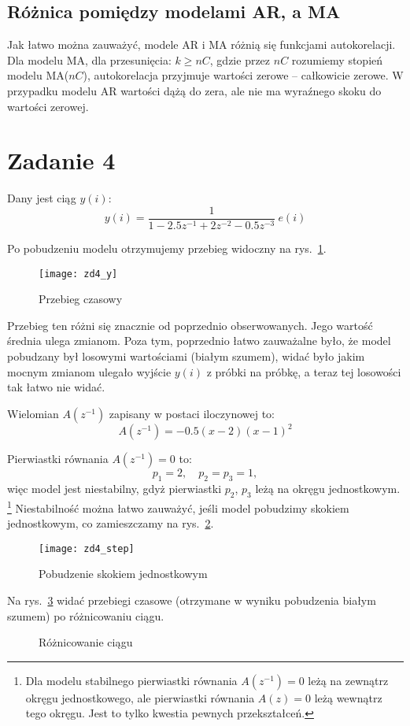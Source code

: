 \documentclass[11pt, a4paper]{article}
\begin{document}
\subsection*{Różnica pomiędzy modelami AR, a MA}
Jak łatwo można zauważyć, modele AR i MA różnią się funkcjami autokorelacji. Dla modelu MA, dla przesunięcia: $k \ge nC$, gdzie przez $nC$ rozumiemy stopień modelu MA($nC$), autokorelacja przyjmuje wartości zerowe -- całkowicie zerowe.
W przypadku modelu AR wartości dążą do zera, ale nie ma wyraźnego skoku do wartości zerowej.

\section*{Zadanie 4}
Dany jest ciąg $y(i)$:
\[
	y(i) = \frac{1}{1 - 2.5 z^{-1} + 2 z^{-2} -0.5 z^{-3}} \ e(i)
\]

Po pobudzeniu modelu otrzymujemy przebieg widoczny na rys.~\ref{fig:zd4_1}.
\begin{figure}[htbp!]
	\centering
	\texttt{[image: zd4\_y]}
	\caption{Przebieg czasowy}
	\label{fig:zd4_1}
\end{figure}

Przebieg ten różni się znacznie od poprzednio obserwowanych. Jego wartość średnia ulega zmianom.
Poza tym, poprzednio łatwo zauważalne było, że model pobudzany był losowymi wartościami (białym szumem), widać było jakim mocnym zmianom ulegało wyjście $y(i)$ z próbki na próbkę, a teraz tej losowości tak łatwo nie widać.

Wielomian $A(z^{-1})$ zapisany w postaci iloczynowej to:
\[
	A(z^{-1}) = -0.5 (x - 2) (x - 1)^2
\]

Pierwiastki równania $A(z^{-1}) = 0$ to:
\[
	p_1 = 2, \quad p_2 = p_3 = 1,
\]
więc model jest niestabilny, gdyż pierwiastki $p_2$, $p_3$ leżą na okręgu jednostkowym.%
\footnote{Dla modelu stabilnego pierwiastki równania $A(z^{-1}) = 0$ leżą na zewnątrz okręgu jednostkowego, 
ale pierwiastki równania $A(z) = 0$ leżą wewnątrz tego okręgu. Jest to tylko kwestia pewnych przekształceń.}
Niestabilność można łatwo zauważyć, jeśli model pobudzimy skokiem jednostkowym, co zamieszczamy na
rys.~\ref{fig:zd4_unstable}.
\begin{figure}[htbp!]
	\centering
	\texttt{[image: zd4\_step]}
	\caption{Pobudzenie skokiem jednostkowym}
	\label{fig:zd4_unstable}
\end{figure}

Na rys.~\ref{fig:zd4_d} widać przebiegi czasowe (otrzymane w wyniku pobudzenia białym szumem) po różnicowaniu ciągu.
\begin{figure}[htbp!]
	\centering
	
	\hfill%

	\caption{Różnicowanie ciągu}
	\label{fig:zd4_d}
\end{figure}
\end{document}
